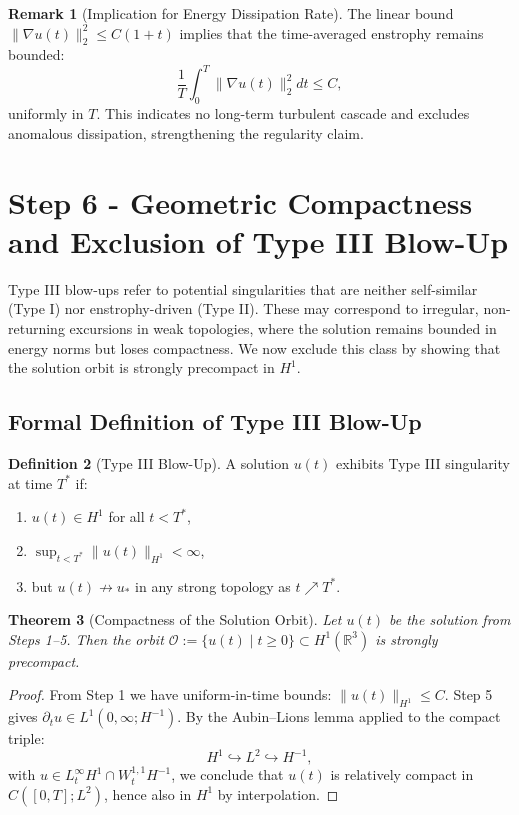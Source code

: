 \documentclass[11pt]{article}
\newtheorem{theorem}{Theorem}[section]
\theoremstyle{definition}
\newtheorem{definition}[theorem]{Definition}
\newtheorem{remark}[theorem]{Remark}
\begin{document}
\begin{remark}[Implication for Energy Dissipation Rate]
The linear bound \( \|\nabla u(t)\|_2^2 \le C(1 + t) \) implies that the time-averaged enstrophy remains bounded:
\[
\frac{1}{T} \int_0^T \|\nabla u(t)\|_2^2 dt \le C,
\]
uniformly in $T$. This indicates no long-term turbulent cascade and excludes anomalous dissipation, strengthening the regularity claim.
\end{remark}


\section{Step 6 - Geometric Compactness and Exclusion of Type III Blow-Up}
\label{sec:step6}

Type III blow-ups refer to potential singularities that are neither self-similar (Type I) nor enstrophy-driven (Type II). These may correspond to irregular, non-returning excursions in weak topologies, where the solution remains bounded in energy norms but loses compactness. We now exclude this class by showing that the solution orbit is strongly precompact in \( H^1 \).

\subsection*{Formal Definition of Type III Blow-Up}
\begin{definition}[Type III Blow-Up]
A solution \( u(t) \) exhibits Type III singularity at time \( T^* \) if:
\begin{enumerate}
  \item \( u(t) \in H^1 \) for all \( t < T^* \),
  \item \( \sup_{t < T^*} \|u(t)\|_{H^1} < \infty \),
  \item but \( u(t) \not\to u_* \) in any strong topology as \( t \nearrow T^* \).
\end{enumerate}
\end{definition}

\begin{theorem}[Compactness of the Solution Orbit]
Let $u(t)$ be the solution from Steps 1–5. Then the orbit \( \mathcal{O} := \{ u(t) \mid t \ge 0 \} \subset H^1(\mathbb{R}^3) \) is strongly precompact.
\end{theorem}

\begin{proof}
From Step 1 we have uniform-in-time bounds: \( \|u(t)\|_{H^1} \le C \). Step 5 gives \( \partial_t u \in L^1(0,\infty; H^{-1}) \). By the Aubin–Lions lemma applied to the compact triple:
\[
H^1 \hookrightarrow L^2 \hookrightarrow H^{-1},
\]
with \( u \in L^\infty_t H^1 \cap W^{1,1}_t H^{-1} \), we conclude that \( u(t) \) is relatively compact in \( C([0,T]; L^2) \), hence also in \( H^1 \) by interpolation.
\end{proof}
\end{document}
